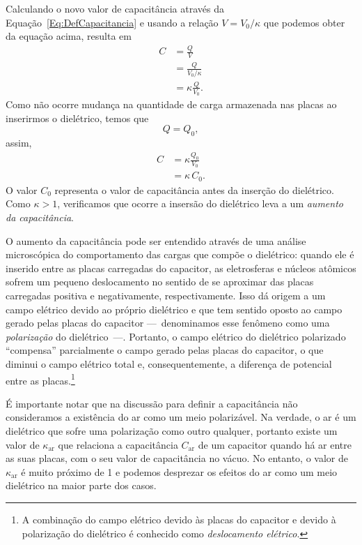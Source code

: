 Calculando o novo valor de capacitância através da Equação~\eqref{Eq:DefCapacitancia} e usando a relação $V = V_0 / \kappa$ que podemos obter da equação acima, resulta em
\begin{align}
    C &= \frac{Q}{V} \\
    &= \frac{Q}{V_0 / \kappa} \\
    &=\kappa \frac{Q}{V_0}.
\end{align}
%
Como não ocorre mudança na quantidade de carga armazenada nas placas ao inserirmos o dielétrico, temos que
\begin{equation}
    Q = Q_0,
\end{equation}
%
assim,
\begin{align}
    C &= \kappa \frac{Q_0}{V_0} \\
    &= \kappa \, C_0.
\end{align}
%
O valor $C_0$ representa o valor de capacitância antes da inserção do dielétrico. Como $\kappa > 1$, verificamos que ocorre a insersão do dielétrico leva a um \emph{aumento da capacitância}.

O aumento da capacitância pode ser entendido através de uma análise microscópica do comportamento das cargas que compõe o dielétrico: quando ele é inserido entre as placas carregadas do capacitor, as eletrosferas e núcleos atômicos sofrem um pequeno deslocamento no sentido de se aproximar das placas carregadas positiva e negativamente, respectivamente. Isso dá origem a um campo elétrico devido ao próprio dielétrico e que tem sentido oposto ao campo gerado pelas placas do capacitor ---~denominamos esse fenômeno como uma \emph{polarização} do dielétrico~---. Portanto, o campo elétrico do dielétrico polarizado ``compensa'' parcialmente o campo gerado pelas placas do capacitor, o que diminui o campo elétrico total e, consequentemente, a diferença de potencial entre as placas.\footnote{A combinação do campo elétrico devido às placas do capacitor e devido à polarização do dielétrico é conhecido como \emph{deslocamento elétrico}.}

É importante notar que na discussão para definir a capacitância não consideramos a existência do ar como um meio polarizável. Na verdade, o ar é um dielétrico que sofre uma polarização como outro qualquer, portanto existe um valor de $\kappa_{\text{ar}}$ que relaciona a capacitância $C_{\text{ar}}$ de um capacitor quando há ar entre as suas placas, com o seu valor de capacitância no vácuo. No entanto, o valor de $\kappa_{\text{ar}}$ é muito próximo de 1 e podemos desprezar os efeitos do ar como um meio dielétrico na maior parte dos casos.

